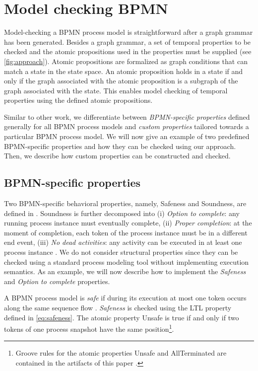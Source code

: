 \documentclass[adraft, copyright, creativecommons]{eptcs} %
\begin{document}
\section{Model checking BPMN} \label{sec:modelChecking}

Model-checking a BPMN process model is straightforward after a graph grammar has been generated.
Besides a graph grammar, a set of temporal properties to be checked and the atomic propositions used in the properties must be supplied (see \cref{fig:approach}).
Atomic propositions are formalized as graph conditions that can match a state in the state space.
An atomic proposition holds in a state if and only if the graph associated with the atomic proposition is a subgraph of the graph associated with the state. %
This enables model checking of temporal properties using the defined atomic propositions.

Similar to other work, we differentiate between \emph{BPMN-specific properties} defined generally for all BPMN process models and \emph{custom properties} tailored towards a particular BPMN process model.
We will now give an example of two predefined BPMN-specific properties and how they can be checked using our approach.
Then, we describe how custom properties can be constructed and checked.

\subsection{BPMN-specific properties}
Two BPMN-specific behavioral properties, namely, Safeness and Soundness, are defined in \cite{corradiniClassificationBPMNCollaborations2018}.
Soundness is further decomposed into (i) \emph{Option to complete}: any running process instance must eventually complete, (ii) \emph{Proper completion}: at the moment of completion, each token of the process instance must be in a different end event, (iii) \emph{No dead activities}: any activity can be executed in at least one process instance \cite{corradiniClassificationBPMNCollaborations2018}.
We do not consider structural properties since they can be checked using a standard process modeling tool without implementing execution semantics.
As an example, we will now describe how to implement the \emph{Safeness} and \emph{Option to complete} properties.

A BPMN process model is \emph{safe} if during its execution at most one token occurs along the same sequence flow \cite{corradiniClassificationBPMNCollaborations2018}.
\emph{Safeness} is checked using the LTL property defined in \eqref{eq:safeness}.
The atomic property \textsf{Unsafe} is true if and only if two tokens of one process snapshot have the same position\footnote{\label{footnote:atomicProps}Groove rules for the atomic properties \textsf{Unsafe} and \textsf{AllTerminated} are contained in the artifacts of this paper \cite{timkrauterArtifactsTERMGRAPH2022}.}.
\end{document}
